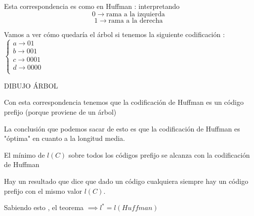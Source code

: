 Esta correspondencia es como en Huffman : interpretando 
$$0 \rightarrow \text{rama a la izquierda}$$
$$1 \rightarrow \text{rama a la derecha}$$

Vamos a ver cómo quedaría el árbol si tenemos la siguiente codificación : $\begin{cases}
a \rightarrow 01\\ b \rightarrow 001\\ c \rightarrow 0001\\ d \rightarrow 0000\\
\end{cases}$

DIBUJO ÁRBOL

Con esta correspondencia tenemos que la codificación de Huffman es un código prefijo (porque proviene de un árbol)

La conclusión que podemos sacar de esto es que la codificación de Huffman es "óptima" en cuanto a la longitud media.

\begin{theorem}
	El mínimo de $l(C)$ sobre todos los códigos prefijo se alcanza con la codificación de Huffman
\end{theorem}
\obs Hay un resultado que dice que dado un código cualquiera siempre hay un código prefijo con el mismo valor $l(C)$.

Sabiendo esto , el teorema $\implies l^{*}= l(Huffman)$



